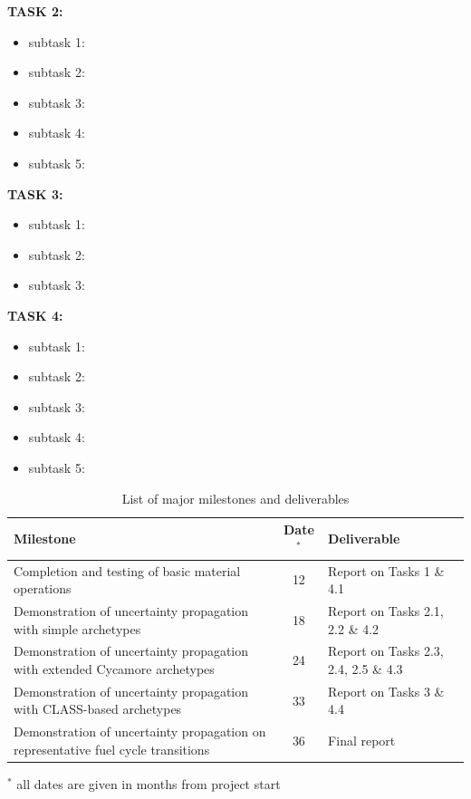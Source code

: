 \documentclass[dvips,11pt]{article}
\begin{document}
\noindent\textbf{TASK 2:}
\begin{itemize}[nosep]
\item subtask 1: 
\item subtask 2: 
\item subtask 3: 
\item subtask 4: 
\item subtask 5: 
\end{itemize}

\noindent\textbf{TASK 3:}
\begin{itemize}[nosep]
\item subtask 1:
\item subtask 2:
\item subtask 3:
\end{itemize}
 
\noindent\textbf{TASK 4:}
\begin{itemize}[nosep]
\item subtask 1:
\item subtask 2:
\item subtask 3:
\item subtask 4:
\item subtask 5:
\end{itemize}

\begin{table}[h!]
\caption{List of major milestones and deliverables}
\begin{tabularx}{
\textwidth}{|X|c|l|}\hline
 \textbf{Milestone}       & 
     \textbf{Date}$^*$&
     \textbf{Deliverable} \\\hline
 Completion and testing of basic material operations      &   
     12                         & 
     Report on Tasks 1 \& 4.1   \\\hline
 Demonstration of uncertainty propagation with simple archetypes  &   
     18       & 
     Report on Tasks 2.1, 2.2 \& 4.2 \\\hline
 Demonstration of uncertainty propagation with extended Cycamore archetypes &
     24       &
     Report on Tasks 2.3, 2.4, 2.5 \& 4.3 \\\hline
 Demonstration of uncertainty propagation with CLASS-based archetypes &
     33       &
     Report on Tasks 3 \& 4.4 \\\hline
 Demonstration of uncertainty propagation on representative fuel cycle transitions &
     36       &
     Final report\\\hline
\end{tabularx}
{\footnotesize $^*$ all dates are given in months from project start}
\end{table}
\end{document}
